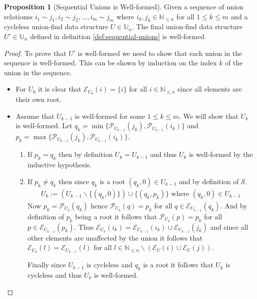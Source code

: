 \documentclass[a4paper,12pt]{article}
\theoremstyle{definition}
\newtheorem{proposition}{Proposition}[section]
\begin{document}
\begin{proposition}[Sequential Unions is Well-formed]
    Given a sequence of union relationss $i_1 \sim j_1, i_2 \sim j_2, \ldots,
    i_m \sim j_m$ where $i_k, j_k \in \mathbb{N}_{\leq n}$ for all $1 \leq k
    \leq m$ and a cycleless union-find data structure $U \in \mathbb{U}_n$. The
    final union-find data structure $U' \in \mathbb{U}_n$ defined in definition
    \ref{def:sequential-unions} is well-formed.
\end{proposition}
\begin{proof}
    To prove that $U'$ is well-formed we need to show that each union in the
    sequence is well-formed. This can be shown by induction on the index $k$ of
    the union in the sequence.
    \begin{itemize}
        \item For $U_0$ it is clear that $\mathcal{E}_{U_0}(i) = \{i\}$ for all $i \in
        \mathbb{N}_{\leq n}$ since all elements are their own root.
        \item Assume that $U_{k-1}$ is well-formed for some $1 \leq k \leq m$.
        We will show that $U_k$ is well-formed. Let $q_k = \min
        \{\mathcal{P}_{U_{k-1}}(j_k), \mathcal{P}_{U_{k-1}}(i_k)\}$ and $p_k =
        \max \{\mathcal{P}_{U_{k-1}}(j_k), \mathcal{P}_{U_{k-1}}(i_k)\}$.
        \begin{enumerate}
            \item If $p_k = q_k$ then by definition $U_k = U_{k-1}$ and thus
            $U_k$ is well-formed by the inductive hypothesis.
            \item If $p_k \neq q_k$ then since $q_k$ is a root $(q_k, 0) \in U_{k - 1}$ and by definition
            of $\mathcal{S}$.
            \begin{align*}
                U_k := (U_{k-1} \backslash \{(q_k, 0)\}) \cup \{(q_k, p_k)\} \text{ where } (q_k, 0) \in U_{k-1}
            \end{align*}
            Now $p_k = \mathcal{P}_{U_k}(q_k)$ hence $\mathcal{P}_{U_k}(q) = p_k$ for all $q
            \in \mathcal{E}_{U_{k - 1}}(q_k)$. And by definition of $p_k$ being
            a root it follows that $\mathcal{P}_{U_k}(p) = p_k$ for all $p \in
            \mathcal{E}_{U_{k - 1}}(p_k)$. Thus $\mathcal{E}_{U_k}(i_k) =
            \mathcal{E}_{U_{k - 1}}(i_k) \cup \mathcal{E}_{U_{k - 1}}(j_k)$ and
            since all other elements are unaffected by the union it follows that
            $\mathcal{E}_{U_k}(l) = \mathcal{E}_{U_{k - 1}}(l)$ for all $l \in
            \mathbb{N}_{\leq n} \backslash (\mathcal{E}_U(i) \cup
            \mathcal{E}_U(j))$.

            Finally since $U_{k-1}$ is cycleless and $q_k$ is a root it follows
            that $U_k$ is cycleless and thus $U_k$ is well-formed.
        \end{enumerate}
    \end{itemize}
\end{proof}
\end{document}
